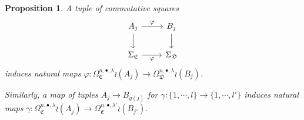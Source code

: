 \documentclass[a4paper,10pt
,draft
]{article}%
\numberwithin{equation}{section}
\numberwithin{figure}{section}
\newtheorem{proposition}[equation]{Proposition}%
\theoremstyle{definition} %
\newcommand{\1}{\ensuremath{\mathbbm 1}}%
\begin{document}
\begin{proposition}\label{SPANPIECEJ PROP}
A tuple of commutative squares
\begin{equation}\label{SPANPIECEJ EQ}
\begin{tikzcd}
	A_j \ar{d} \ar{r}{\varphi} &  \ar{d} B_j
\\
	\Sigma_{\mathfrak{C}} \ar{r}[swap]{\varphi} & \Sigma_{\mathfrak{D}}
\end{tikzcd}
\end{equation}
induces natural maps 
$\varphi \colon
\Omega_{\mathfrak{C}}^{n,\bullet,\lambda} \wr (A_j) \to 
\Omega_{\mathfrak{D}}^{n,\bullet,\lambda} \wr (B_j) $.

Similarly, a map of tuples $A_j \to B_{g(j)}$ for 
$\gamma \colon \{1,\cdots,l\} \to \{1,\cdots,l'\}$
induces natural maps 
$\gamma \colon
\Omega_{\mathfrak{C}}^{n,\bullet,\lambda} \wr (A_j) \to 
\Omega_{\mathfrak{C}}^{n,\bullet,\lambda'} \wr (B_{j'}) $.



\end{proposition}
\end{document}
